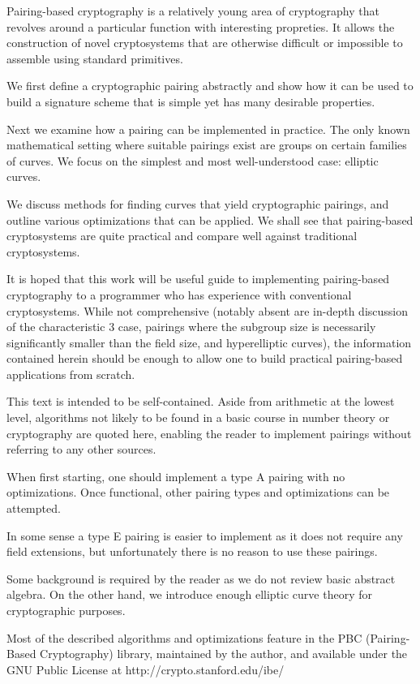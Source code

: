 \beforepreface
{}
Pairing-based cryptography is a relatively young area of cryptography that
revolves around a particular function with interesting propreties.
It allows the construction of novel cryptosystems that are otherwise
difficult or impossible to assemble using standard primitives.

We first define a cryptographic pairing abstractly and show how it
can be used to build a signature scheme that is simple yet has many
desirable properties.

Next we examine how a pairing can be implemented in practice. The only known
mathematical setting where suitable pairings exist are groups on certain
families of curves. We focus on the simplest and most well-understood case:
elliptic curves.

We discuss methods for finding curves that yield cryptographic pairings,
and outline various optimizations that can be applied. We shall see that
pairing-based cryptosystems are quite practical and compare well against
traditional cryptosystems.

It is hoped that this work will be useful guide to implementing pairing-based
cryptography to a programmer who has experience with conventional
cryptosystems. While not comprehensive (notably absent are in-depth
discussion of the characteristic 3 case, pairings where
the subgroup size is necessarily significantly smaller than the field size,
and hyperelliptic curves),
the information contained herein should be enough to allow one to build
practical pairing-based applications from scratch.

This text is intended to be self-contained. Aside from
arithmetic at the lowest level, algorithms not likely to
be found in a basic course in number theory or cryptography are quoted here,
enabling the reader to implement pairings without referring to any other
sources.

When first starting, one should implement a type A
pairing with no optimizations. Once functional, other pairing types
and optimizations can be attempted.

In some sense a type E pairing is easier to implement as it does not
require any field extensions, but unfortunately there is no reason to
use these pairings.

Some background is required by the reader as
we do not review basic abstract algebra.
On the other hand, we introduce enough elliptic curve theory for
cryptographic purposes.

Most of the described algorithms and optimizations
feature in the PBC (Pairing-Based Cryptography) library, maintained by the
author, and available under the GNU Public License at 
http://crypto.stanford.edu/ibe/
